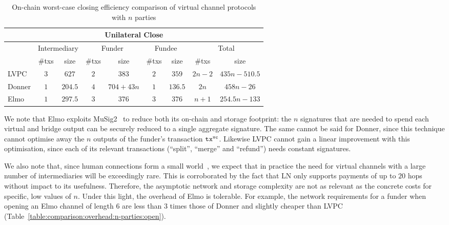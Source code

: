   \addtolength{\intextsep}{-30pt}
  \begin{table}[h!]
    \begin{minipage}{\textwidth}
    \centering
    \begin{tabular}{|l|c|c|c|c|c|c|c|c|}
    \hline
    \multicolumn{9}{|c|}{Unilateral Close} \\
    \hline
              & \multicolumn{2}{|c|}{Intermediary}
              & \multicolumn{2}{|c|}{Funder} & \multicolumn{2}{|c|}{Fundee}
              & \multicolumn{2}{|c|}{Total} \\
    \hline
              & \#txs & size & \#txs & size & \#txs & size & \#txs & size \\
    \hline
    LVPC      & $3$ & $627$ & $2$ & $383$ & $2$ & $359$ & $2n-2$ & $435n -
              510.5$ \\
    \hline
    Donner    & $1$ & $204.5$ & $4$ & $704 + 43n$ & $1$ & $136.5$ & $2n$ & $458n
              - 26$ \\
    \hline
    Elmo      & $1$ & $297.5$ & $3$ & $376$ & $3$ & $376$
              & $n+1$ & $254.5n-133$ \\
    \hline
    \end{tabular}
    \end{minipage}
    \caption{On-chain worst-case closing efficiency comparison of virtual
    channel protocols with $n$ parties}
    \label{table:comparison:overhead:n-parties:close}
  \end{table}
  \addtolength{\intextsep}{30pt}

  We note that Elmo exploits
  MuSig2~\cite{DBLP:journals/dcc/MaxwellPSW19,DBLP:conf/crypto/NickRS21} to
  reduce both its
  on-chain and storage footprint: the $n$ signatures that are needed to spend
  each virtual and bridge output can be securely reduced to a single aggregate
  signature. The same cannot be said for
  Donner, since this technique cannot optimise away the $n$ outputs of the
  funder's transaction $\texttt{tx}^{\mathtt{vc}}$. Likewise LVPC cannot gain a linear
  improvement with this optimisation, since each of its relevant transactions
  (``split'', ``merge'' and ``refund'') needs constant signatures.

  We also note that, since human connections form a
  small world~\cite{smallworld}, we expect that in practice the
  need for virtual channels with a large number of
  intermediaries will be exceedingly rare. This is corroborated by
  the fact that LN only supports payments of up to $20$ hops
  without impact to its usefulness. Therefore, the asymptotic
  network and storage complexity are not as relevant as the
  concrete costs for specific, low values of $n$. Under this
  light, the overhead of Elmo is tolerable. For example, the
  network requirements for a funder when opening an Elmo channel
  of length $6$ are less than $3$ times those of Donner and
  slightly cheaper than LVPC
  (Table~\ref{table:comparison:overhead:n-parties:open}).

